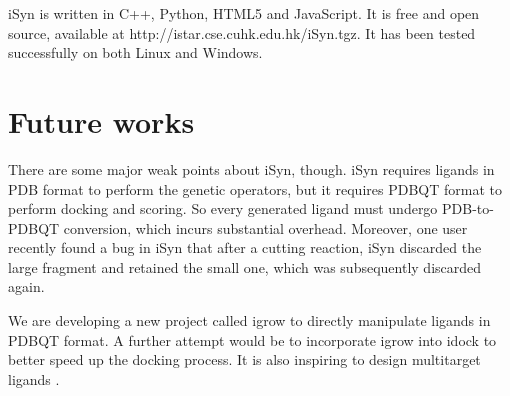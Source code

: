 iSyn is written in C++, Python, HTML5 and JavaScript. It is free and open source, available at http://istar.cse.cuhk.edu.hk/iSyn.tgz. It has been tested successfully on both Linux and Windows.

\section{Future works}

There are some major weak points about iSyn, though. iSyn requires ligands in PDB format to perform the genetic operators, but it requires PDBQT format to perform docking and scoring. So every generated ligand must undergo PDB-to-PDBQT conversion, which incurs substantial overhead. Moreover, one user recently found a bug in iSyn that after a cutting reaction, iSyn discarded the large fragment and retained the small one, which was subsequently discarded again.

We are developing a new project called igrow to directly manipulate ligands in PDBQT format. A further attempt would be to incorporate igrow into idock to better speed up the docking process. It is also inspiring to design multitarget ligands \citep{366,1497}.

\chapterend
